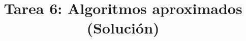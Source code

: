 \documentclass{doc}
\title{Tarea 6: Algoritmos aproximados (Solución)}
\begin{document}
\makedocheader
\soluciontrue

\end{document}
